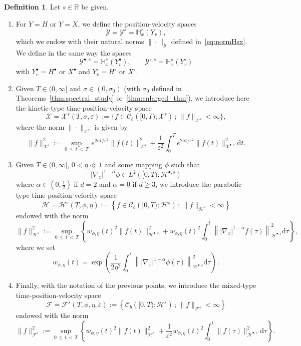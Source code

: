 \documentclass[10pt]{amsart}
\theoremstyle{definition}\newtheorem{defi}[theo]{Definition}\newtheorem{rema}[theo]{Remark}\newtheorem{exam}[theo]{Example}\newtheorem{exem}[theo]{Example}\newtheorem{nota}[theo]{Notation}
\renewcommand{\d}{\mathrm{d}}
\newcommand{\R}{\mathbb{R}}
\newcommand{\bbH}{\mathbb{H}}
\newcommand{\CC}{\mathcal{C}}
\newcommand{\XX}{\mathcal{X}}
\newcommand{\HH}{\mathcal{H}}
\newcommand{\VV}{\mathcal{Y}}
\newcommand{\FFF}{\mathscr{F}}
\newcommand{\HHH}{\mathscr{H}}
\newcommand{\GGG}{\mathscr{X}}
\newcommand{\Ss}{H}
\newcommand{\Ssp}{H^{\bullet}}
\newcommand{\Ssm}{H^{\circ}}
\newcommand{\rSSs}[1]{\HH^{#1}}
\newcommand{\rSSsp}[1]{\HH^{{\bullet}, #1}}
\newcommand{\SSSs}{\HHH}
\newcommand{\rSSSs}[1]{\HHH^{#1}}
\newcommand{\Sl}{X}
\newcommand{\Slp}{X^{\bullet}}
\newcommand{\Slm}{X^{\circ}}
\newcommand{\rSSl}[1]{\XX^{#1}}
\newcommand{\rSSlp}[1]{\XX^{\bullet, #1}}
\newcommand{\SSSl}{\GGG}
\newcommand{\rSSSl}[1]{\GGG^{#1}}
\newcommand{\SSSm}{\FFF}
\newcommand{\rSSSm}[1]{\FFF^{#1}}
\newcommand{\Sg}{Y}
\newcommand{\Sgp}{Y^{\bullet}}
\newcommand{\Sgm}{Y^{\circ}}
\newcommand{\SSg}{\VV}
\newcommand{\rSSgp}[1]{\VV^{\bullet, #1}}
\newcommand{\rSSgm}[1]{\VV^{\circ, #1}}
\renewcommand*\le{\leqslant}
\renewcommand*\ge{\geqslant}
\newcommand*\eps{{\varepsilon}}
\begin{document}
\begin{defi}\label{defi:NORMSPACES}
Let $s \in \R$ be given.
\begin{enumerate}
\item For $\Sg=\Ss$ or $\Sg=\Sl$, we define the position-velocity spaces
\[
\SSg = \SSg^s = \bbH^{s}_{x}(\Sg_v),
\]
which we endow with their natural norms $\|\cdot\|_{\SSg}$ defined in~\eqref{eq:normHsx}. We define in the same way the spaces
\[
\rSSgp{s}=\bbH^s_x(\Sgp_v), \qquad \rSSgm{s}=\bbH^s_x(\Sgm_v)
\]
with $\Sgp_v=\Ssp$ or $\Slp$ and $\Sgm_v=\Ssm$ or $\Slm.$
\item Given $T \in (0,\infty]$ and $\sigma \in (0,\sigma_0)$ (with $\sigma_0$ defined in Theorems~\ref{thm:spectral_study} or~\ref{thm:enlarged_thm}), we introduce here the kinetic-type time-position-velocity space
\[
\SSSl=\rSSSl{s}(T, \sigma, \eps):= \big\{ f \in \CC_b\left([0, T) ; \rSSl{s} \right) \, ; \, \| f \|_{\rSSSl{s}} < \infty \big\},
\]
where the norm $\| \cdot \|_{\rSSSl{s}}$ is given by
\[
\| f \|_{ \rSSSl{s}}^2 := \sup_{0\,\le\,t\,<\,T} \, e^{2 \sigma t / \eps^2 } \| f(t) \|_{\rSSl{s}}^2 + \frac{1}{\eps^2} \int_0^T e^{2 \sigma t / \eps^2} \| f(t) \|_{{\rSSlp{s}}}^2 \d t.
\]
\item Given $T \in (0,\infty]$, $0 < \eta \ll 1$ and some mapping $\phi$ such that
\begin{equation}\label{eq:nablaPhi}
\left|\nabla_x\right|^{1-\alpha}\phi \in L^2\left([0, T) ; \rSSsp{s} \right)
\end{equation}
where $\alpha \in (0, \frac{1}{2})$ if $d = 2$ and $\alpha = 0$ if $d \ge 3$, we introduce the parabolic-type time-position-velocity space
\[
\SSSs=\rSSSs{s}(T, \phi, \eta):= \left\{ f \in \CC_b\left([0, T) ; \rSSs{s} \right) \, ; \, \| f \|_{\rSSSs{s}} < \infty \right\}
\]
endowed with the norm
\[
\| f \|_{\rSSSs{s}}^2 := \sup_{0\,\le\,t\,<\,T} \left\{ w_{\phi, \eta}(t)^2 \| f(t) \|_{\rSSsp{s}}^2 + w_{\phi, \eta}(t)^2 \int_0^t \left\| |\nabla_x|^{1-\alpha} f(\tau) \right\|_{\rSSsp{s}}^2 \d \tau \right\},
\]
where we set
\begin{equation}\label{eq:wphieta}
w_{\phi, \eta}(t) = \exp\left(\frac{1}{2 \eta^2} \int_0^t\left\| |\nabla_x|^{1-\alpha} \phi(\tau) \right\|_{\rSSsp{s}}^2 \d \tau \right)\,.
\end{equation}
\item Finally, with the notation of the previous points, we introduce the mixed-type time-position-velocity space
\[
\SSSm = \rSSSm{s}(T, \phi, \eta, \eps):= \left\{ \CC_b\left([0, T) ; \rSSs{s} \right) \, ; \, \| f \|_{\rSSSm{s}} < \infty \right\}
\]
endowed with the norm
\[
\| f \|_{\rSSSm{s}}^2 := \sup_{0\,\le\,t\,<\,T} \left\{ w_{\phi, \eta}(t)^2 \| f(t) \|_{\rSSs{s}}^2 + \frac{1}{\eps^2} w_{\phi, \eta}(t)^2 \int_0^t \| f(\tau) \|_{\rSSsp{s}}^2 \d \tau \right\}.
\]
\end{enumerate}
\end{defi}
\end{document}
